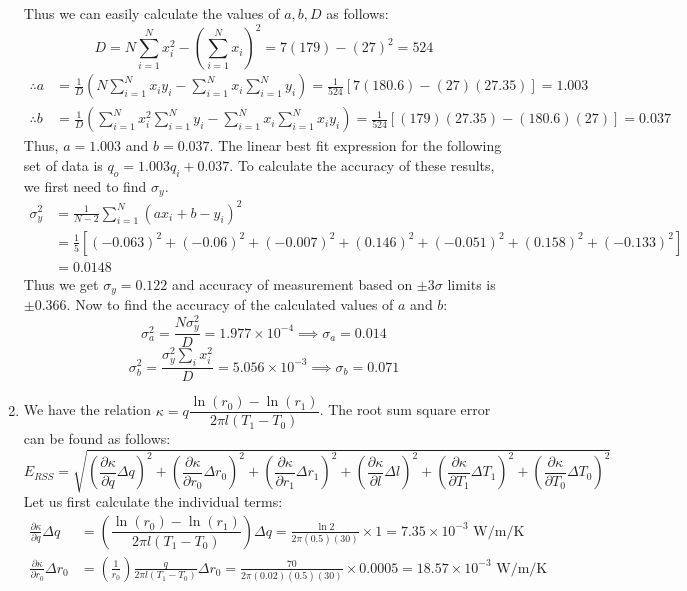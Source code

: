 \documentclass[a4paper, 11pt]{article}
\begin{document}
\begin{enumerate}[label=(\arabic*),leftmargin=*]
Thus we can easily calculate the values of $a,b,D$ as follows:
$$D=N\sum_{i=1}^N x_i^2-\left(\sum_{i=1}^N x_i\right)^2=7(179)-(27)^2=524$$
\begin{align*}
	\therefore a&=\frac{1}{D}\left(N\sum_{i=1}^N x_iy_i-\sum_{i=1}^N x_i\sum_{i=1}^N y_i\right)=\frac{1}{524}[7(180.6)-(27)(27.35)]=1.003\\
	\therefore b&=\frac{1}{D}\left(\sum_{i=1}^N x_i^2\sum_{i=1}^N y_i-\sum_{i=1}^N x_i\sum_{i=1}^N x_iy_i\right)=\frac{1}{524}[(179)(27.35)-(180.6)(27)]=0.037
\end{align*}
Thus, $\boxed{a=1.003}$ and $\boxed{b=0.037}$. The linear best fit expression for the following set of data is $q_o=1.003q_i+0.037$. To calculate the accuracy of these results, we first need to find $\sigma_y$.
\begin{align*}
	\sigma_y^2&=\frac{1}{N-2}\sum_{i=1}^N (ax_i+b-y_i)^2\\
	&=\frac{1}{5}[(-0.063)^2+(-0.06)^2+(-0.007)^2+(0.146)^2+(-0.051)^2+(0.158)^2+(-0.133)^2]\\
	&=0.0148
\end{align*}
Thus we get $\boxed{\sigma_y=0.122}$ and accuracy of measurement based on $\pm 3\sigma$ limits is $\pm 0.366$. Now to find the accuracy of the calculated values of $a$ and $b$:
$$\sigma_a^2=\frac{N\sigma_y^2}{D}=1.977\times 10^{-4}\implies\boxed{\sigma_a=0.014}$$
$$\sigma_b^2=\frac{\sigma_y^2\sum_i x_i^2}{D}=5.056\times 10^{-3}\implies\boxed{\sigma_b=0.071}$$
\newpage
	\item We have the relation $\kappa=q \dfrac{\ln(r_0)-\ln(r_1)}{2\pi l(T_1-T_0)}$. The root sum square error can be found as follows:
	$$E_{RSS}=\sqrt{\left(\frac{\partial\kappa}{\partial q}\Delta q\right)^2+\left(\frac{\partial\kappa}{\partial r_0}\Delta r_0\right)^2+\left(\frac{\partial\kappa}{\partial r_1}\Delta r_1\right)^2+\left(\frac{\partial\kappa}{\partial l}\Delta l\right)^2+\left(\frac{\partial\kappa}{\partial T_1}\Delta T_1\right)^2+\left(\frac{\partial\kappa}{\partial T_0}\Delta T_0\right)^2}$$
Let us first calculate the individual terms:
\begin{align*}
	\frac{\partial\kappa}{\partial q}\Delta{q}&=\left(\dfrac{\ln(r_0)-\ln(r_1)}{2\pi l(T_1-T_0)}\right)\Delta{q}=\frac{\ln 2}{2\pi(0.5)(30)}\times 1=7.35\times 10^{-3} \text{ W/m/K}\\
	\frac{\partial\kappa}{\partial r_0}\Delta{r_0}&=\left(\frac{1}{r_0}\right)\frac{q}{2\pi l(T_1-T_0)}\Delta{r_0}=\frac{70}{2\pi(0.02)(0.5)(30)}\times 0.0005=18.57\times 10^{-3}\text{ W/m/K}\\

\end{align*}
\end{enumerate}
\end{document}

